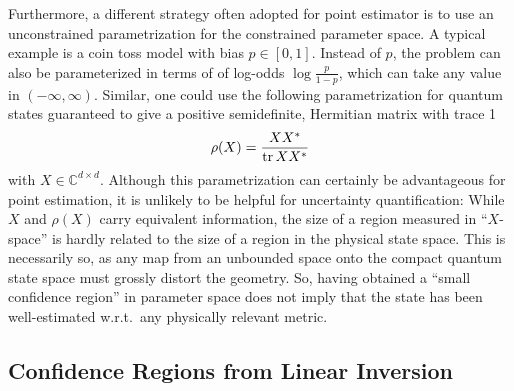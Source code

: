 Furthermore, a different strategy often adopted for point estimator is to use an unconstrained parametrization for the constrained parameter space.
A typical example is a coin toss model with bias $p \in [0, 1]$.
Instead of $p$, the problem can also be parameterized in terms of of log-odds $\log\frac{p}{1 - p}$, which can take any value in $(-\infty,\infty)$.
Similar, one could use the following parametrization for quantum states guaranteed to give a positive semidefinite, Hermitian matrix with trace 1
\[
  \rho(X) = \frac{X {X}^\ast}{\operatorname{tr} X {X}^\ast}
\]
with $X \in \mathbb{C}^{d \times d}$.
Although this parametrization can certainly be advantageous for point estimation, it is unlikely to be helpful for uncertainty quantification:
While $X$ and $\rho(X)$ carry equivalent information, the size of a region measured in ``$X$-space'' is hardly related to the size of a region in the physical state space.
This is necessarily so, as any map from an unbounded space onto the compact quantum state space must grossly distort the geometry.
So, having obtained a ``small confidence region'' in parameter space does not imply that the state has been well-estimated w.r.t.\ any physically relevant metric.

\subsection{Confidence Regions from Linear Inversion}
\label{sub:ortho.linear_inversion}


